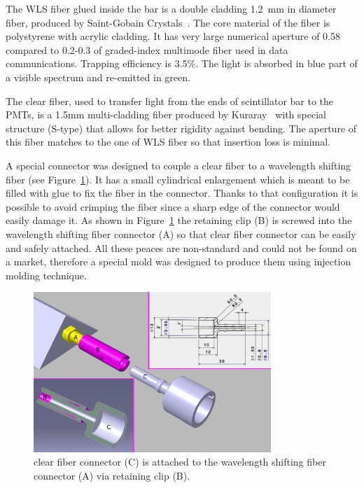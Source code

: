 \documentclass[a4paper,11pt]{article}
\begin{document}
The WLS fiber glued inside the bar is a double cladding 1.2~mm in diameter fiber, produced by Saint-Gobain Crystals~\cite{saintgobain}.
The core material of the fiber is polystyrene with acrylic cladding. It has very large numerical aperture of 0.58 compared to 0.2-0.3
of graded-index multimode fiber used in data communications. Trapping efficiency is 3.5\%. The light is absorbed in blue part of a visible
spectrum and re-emitted in green. 

The clear fiber, used to transfer light from the ends of scintillator bar to the PMTs, is a 1.5mm multi-cladding fiber produced by 
Kuraray~\cite{kuraray} with special structure (S-type) that allows for better rigidity against bending. The aperture of this fiber matches
to the one of WLS fiber so that insertion loss is minimal.

A special connector was designed to couple a clear fiber to a wavelength shifting fiber (see Figure~\ref{fig:fiber_connectors_cad}).
It has a small cylindrical enlargement which is meant to be filled with glue to fix the fiber in the connector. Thanks to that configuration
it is possible to avoid crimping the fiber since a sharp edge of the connector would easily damage it. As shown in Figure~\ref{fig:fiber_connectors_cad}
the retaining clip (B) is screwed into the wavelength shifting fiber connector (A) so that clear fiber connector can be easily and safely
attached. All these peaces are non-standard and could not be found on a market, therefore a special mold was designed to produce them using
injection molding technique. 

\begin{figure}[htp!]
 \centering
 \includegraphics[width=0.8\textwidth]{./fiber_connectors_cad}
 \caption[Clear fiber connector]{clear fiber connector (C) is attached to the wavelength shifting fiber connector (A) via retaining clip (B).}
 \label{fig:fiber_connectors_cad}
\end{figure}
\end{document}
